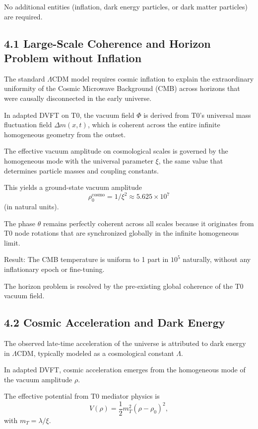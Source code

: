 \documentclass[12pt,a4paper]{article}
\begin{document}
	No additional entities (inflation, dark energy particles, or dark matter particles) are required.
	
	\subsection{4.1 Large-Scale Coherence and Horizon Problem without Inflation}
	
	The standard $\Lambda$CDM model requires cosmic inflation to explain the extraordinary uniformity of the Cosmic Microwave Background (CMB) across horizons that were causally disconnected in the early universe.
	
	In adapted DVFT on T0, the vacuum field $\Phi$ is derived from T0's universal mass fluctuation field $\Delta m(x,t)$, which is coherent across the entire infinite homogeneous geometry from the outset.
	
	The effective vacuum amplitude on cosmological scales is governed by the homogeneous mode with the universal parameter $\xi$, the same value that determines particle masses and coupling constants.
	
	This yields a ground-state vacuum amplitude
	\[
	\rho_0^{\text{cosmo}} = 1 / \xi^2 \approx 5.625 \times 10^7
	\]
	(in natural units).
	
	The phase $\theta$ remains perfectly coherent across all scales because it originates from T0 node rotations that are synchronized globally in the infinite homogeneous limit.
	
	Result: The CMB temperature is uniform to 1 part in $10^5$ naturally, without any inflationary epoch or fine-tuning.
	
	The horizon problem is resolved by the pre-existing global coherence of the T0 vacuum field.
	
	\subsection{4.2 Cosmic Acceleration and Dark Energy}
	
	The observed late-time acceleration of the universe is attributed to dark energy in $\Lambda$CDM, typically modeled as a cosmological constant $\Lambda$.
	
	In adapted DVFT, cosmic acceleration emerges from the homogeneous mode of the vacuum amplitude $\rho$.
	
	The effective potential from T0 mediator physics is
	\[
	V(\rho) = \frac{1}{2} m_T^2 (\rho - \rho_0)^2,
	\]
	with $m_T = \lambda / \xi$.
	
\end{document}
